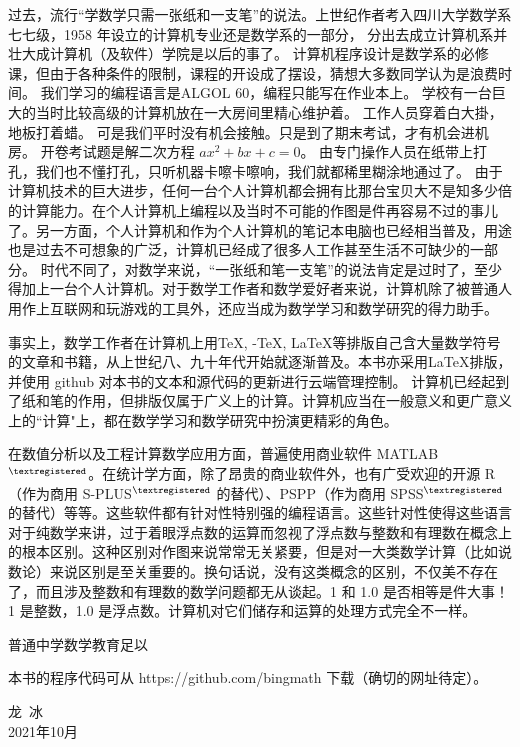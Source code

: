 \documentclass[main.tex]{subfiles}
\begin{document}
过去，流行“学数学只需一张纸和一支笔”的说法。上世纪作者考入四川大学数学系七七级，1958 年设立的计算机专业还是数学系的一部分，
分出去成立计算机系并壮大成计算机（及软件）学院是以后的事了。
计算机程序设计是数学系的必修课，但由于各种条件的限制，课程的开设成了摆设，猜想大多数同学认为是浪费时间。
我们学习的编程语言是ALGOL 60，编程只能写在作业本上。
学校有一台巨大的当时比较高级的计算机放在一大房间里精心维护着。
工作人员穿着白大掛，地板打着蜡。
可是我们平时没有机会接触。只是到了期末考试，才有机会进机房。
开卷考试题是解二次方程 $ax^2+bx+c = 0$。
由专门操作人员在纸带上打孔，我们也不懂打孔，只听机器卡嚓卡嚓响，我们就都稀里糊涂地通过了。
由于计算机技术的巨大进步，任何一台个人计算机都会拥有比那台宝贝大不是知多少倍的计算能力。在个人计算机上编程以及当时不可能的作图是件再容易不过的事儿了。另一方面，个人计算机和作为个人计算机的笔记本电脑也已经相当普及，用途也是过去不可想象的广泛，计算机已经成了很多人工作甚至生活不可缺少的一部分。
时代不同了，对数学来说，“一张纸和笔一支笔”的说法肯定是过时了，至少得加上一台个人计算机。对于数学工作者和数学爱好者来说，计算机除了被普通人用作上互联网和玩游戏的工具外，还应当成为数学学习和数学研究的得力助手。

事实上，数学工作者在计算机上用\TeX, \AmS-\TeX, \LaTeX 等排版自己含大量数学符号的文章和书籍，从上世纪八、九十年代开始就逐渐普及。本书亦采用\LaTeX 排版， 并使用 github 对本书的文本和源代码的更新进行云端管理控制。
计算机已经起到了纸和笔的作用，但排版仅属于广义上的计算。计算机应当在一般意义和更广意义上的“计算"上，都在数学学习和数学研究中扮演更精彩的角色。

在数值分析以及工程计算数学应用方面，普遍使用商业软件 MATLAB${}^{\textregistered}$。在统计学方面，除了昂贵的商业软件外，也有广受欢迎的开源 R（作为商用 S-PLUS${}^{\textregistered}$ 的替代）、PSPP（作为商用 SPSS${}^{\textregistered}$ 的替代）等等。这些软件都有针对性特别强的编程语言。这些针对性使得这些语言对于纯数学来讲，过于着眼浮点数的运算而忽视了浮点数与整数和有理数在概念上的根本区别。这种区别对作图来说常常无关紧要，但是对一大类数学计算（比如说数论）来说区别是至关重要的。换句话说，没有这类概念的区别，不仅美不存在了，而且涉及整数和有理数的数学问题都无从谈起。1 和 1.0 是否相等是件大事！1 是整数，1.0 是浮点数。计算机对它们储存和运算的处理方式完全不一样。

普通中学数学教育足以


本书的程序代码可从 https://github.com/bingmath 下载（确切的网址待定）。


\begin{flushright}
	\centering
{\kaishu 龙\,  冰}\\
2021年10月
\end{flushright}
\end{document}
